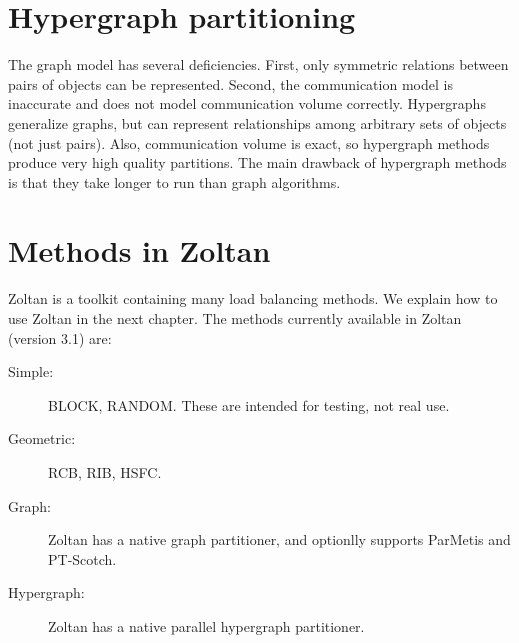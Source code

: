 \section{Hypergraph partitioning}
The graph model has several deficiencies. First, only symmetric
relations between pairs of objects can be represented. Second,
the communication model is inaccurate and does not model
communication volume correctly.
Hypergraphs generalize graphs, but can represent relationships
among arbitrary sets of objects (not just pairs). Also,
communication volume is exact, so hypergraph methods
produce very high quality partitions. The main drawback of hypergraph
methods is that they take longer to run than graph algorithms.

\section{Methods in Zoltan}
Zoltan is a toolkit containing many load balancing methods. We explain how
to use Zoltan in the next chapter. The methods currently available
in Zoltan (version 3.1) are:
\begin{description}
\item[Simple:] BLOCK, RANDOM. These are intended for testing, not real use.
\item[Geometric:] RCB, RIB, HSFC.
\item[Graph:] Zoltan has a native graph partitioner, and optionlly supports ParMetis and PT-Scotch.
\item[Hypergraph:] Zoltan has a native parallel hypergraph partitioner.
\end{description}
